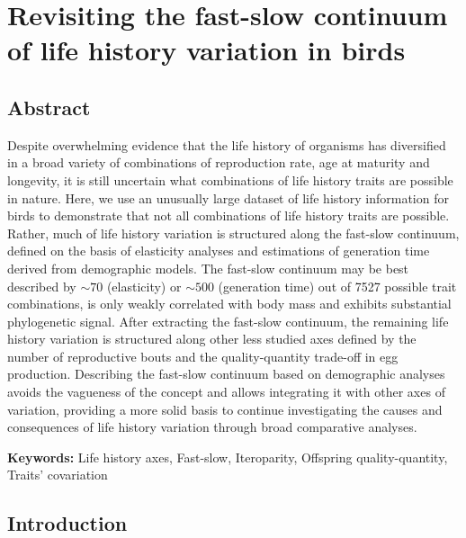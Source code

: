 \chapter[Axes of life history variation]{Revisiting the fast-slow continuum of 
life history variation in birds
}\label{ch:LHaxes}


\section*{Abstract}

Despite overwhelming evidence that the life history of organisms has diversified
in a broad variety of combinations of reproduction rate, age at maturity and
longevity, it is still uncertain what combinations of life history traits are
possible in nature. Here, we use an unusually large dataset of life history
information for birds to demonstrate that not all combinations of life history
traits are possible. Rather, much of life history variation is structured along
the fast-slow continuum, defined on the basis of elasticity analyses and
estimations of generation time derived from demographic models. The fast-slow
continuum may be best described by $\sim70$ (elasticity) or $\sim500$
(generation time) out of 7527 possible trait combinations, is only weakly
correlated with body mass and exhibits substantial phylogenetic signal. After
extracting the fast-slow continuum, the remaining life history variation is
structured along other less studied axes defined by the number of
reproductive bouts and the quality-quantity trade-off in egg production.
Describing the fast-slow continuum based on demographic analyses avoids the
vagueness of the concept and allows integrating it with other axes of variation,
providing a more solid basis to continue investigating the causes and
consequences of life history variation through broad comparative analyses.

\bigskip
\textbf{Keywords:} Life history axes, Fast-slow, Iteroparity, Offspring
quality-quantity, Traits' covariation

\clearpage


\section{Introduction}

